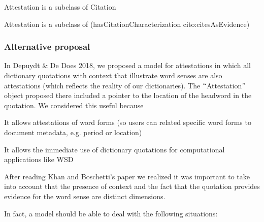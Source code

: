 \documentclass[10pt]{article}
\let\tempone\itemize
\let\temptwo\enditemize
\renewenvironment{itemize}{\tempone\setlength\itemsep{-0.5pt}}{\temptwo}
\begin{document}
\begin{itemize}
	\item {\fontsize{10pt}{12.0pt}\selectfont Attestation is a subclass of Citation\par}\par

	\item {\fontsize{10pt}{12.0pt}\selectfont Attestation is a subclass of (hasCitationCharacterization cito:citesAsEvidence)\par}
\end{itemize}








\subsubsection*{Alternative proposal}


 In Depuydt $\&$  De Does 2018, we proposed a model for attestations in which all dictionary quotations with context that illustrate word senses are also attestations (which reflects the reality of our dictionaries). The $``$Attestation$"$  object proposed there included a pointer to the location of the headword in the quotation. We considered this useful because\par

\begin{itemize}
	\item  It allows attestations of  word forms (so users can related specific word forms to document metadata, e.g. period or location)

	\item  It allows the immediate use of dictionary quotations for computational applications like WSD
\end{itemize}\par

 After reading Khan and Boschetti’s paper we realized it was important to take into account that the presence of context and the fact that the quotation provides evidence for the word sense are distinct dimensions.



 In fact, a model should be able to deal with the following situations:
\end{document}
